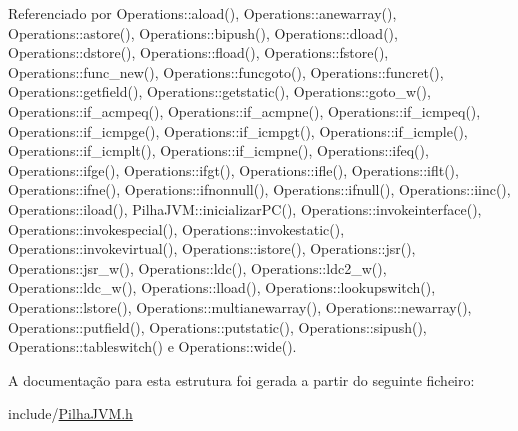 Referenciado por Operations\+::aload(), Operations\+::anewarray(), Operations\+::astore(), Operations\+::bipush(), Operations\+::dload(), Operations\+::dstore(), Operations\+::fload(), Operations\+::fstore(), Operations\+::func\+\_\+new(), Operations\+::funcgoto(), Operations\+::funcret(), Operations\+::getfield(), Operations\+::getstatic(), Operations\+::goto\+\_\+w(), Operations\+::if\+\_\+acmpeq(), Operations\+::if\+\_\+acmpne(), Operations\+::if\+\_\+icmpeq(), Operations\+::if\+\_\+icmpge(), Operations\+::if\+\_\+icmpgt(), Operations\+::if\+\_\+icmple(), Operations\+::if\+\_\+icmplt(), Operations\+::if\+\_\+icmpne(), Operations\+::ifeq(), Operations\+::ifge(), Operations\+::ifgt(), Operations\+::ifle(), Operations\+::iflt(), Operations\+::ifne(), Operations\+::ifnonnull(), Operations\+::ifnull(), Operations\+::iinc(), Operations\+::iload(), Pilha\+J\+V\+M\+::inicializar\+P\+C(), Operations\+::invokeinterface(), Operations\+::invokespecial(), Operations\+::invokestatic(), Operations\+::invokevirtual(), Operations\+::istore(), Operations\+::jsr(), Operations\+::jsr\+\_\+w(), Operations\+::ldc(), Operations\+::ldc2\+\_\+w(), Operations\+::ldc\+\_\+w(), Operations\+::lload(), Operations\+::lookupswitch(), Operations\+::lstore(), Operations\+::multianewarray(), Operations\+::newarray(), Operations\+::putfield(), Operations\+::putstatic(), Operations\+::sipush(), Operations\+::tableswitch() e Operations\+::wide().



A documentação para esta estrutura foi gerada a partir do seguinte ficheiro\+:\begin{DoxyCompactItemize}
\item 
include/\hyperlink{PilhaJVM_8h}{Pilha\+J\+V\+M.\+h}\end{DoxyCompactItemize}
